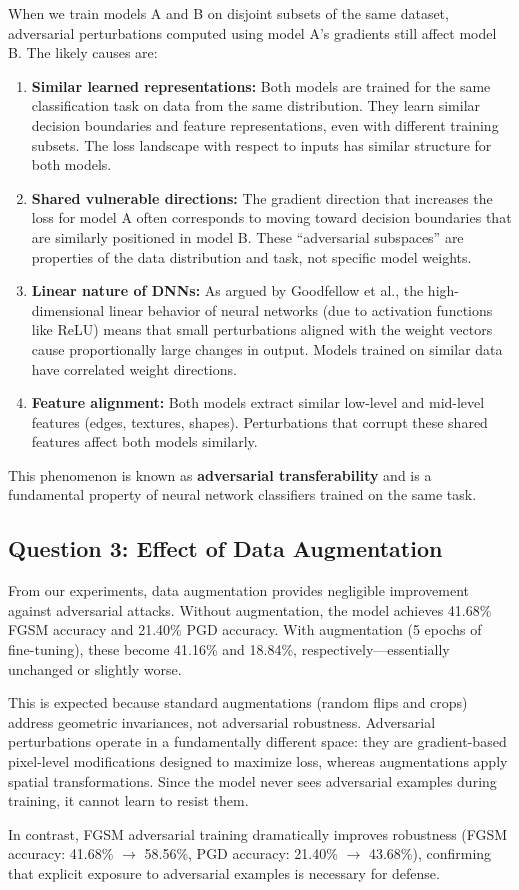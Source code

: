 \documentclass[11pt]{article}
\begin{document}
When we train models A and B on disjoint subsets of the same dataset, adversarial perturbations computed using model A's gradients still affect model B. The likely causes are:

\begin{enumerate}
    \item \textbf{Similar learned representations:} Both models are trained for the same classification task on data from the same distribution. They learn similar decision boundaries and feature representations, even with different training subsets. The loss landscape with respect to inputs has similar structure for both models.
    
    \item \textbf{Shared vulnerable directions:} The gradient direction that increases the loss for model A often corresponds to moving toward decision boundaries that are similarly positioned in model B. These ``adversarial subspaces'' are properties of the data distribution and task, not specific model weights.
    
    \item \textbf{Linear nature of DNNs:} As argued by Goodfellow et al., the high-dimensional linear behavior of neural networks (due to activation functions like ReLU) means that small perturbations aligned with the weight vectors cause proportionally large changes in output. Models trained on similar data have correlated weight directions.
    
    \item \textbf{Feature alignment:} Both models extract similar low-level and mid-level features (edges, textures, shapes). Perturbations that corrupt these shared features affect both models similarly.
\end{enumerate}

This phenomenon is known as \textbf{adversarial transferability} and is a fundamental property of neural network classifiers trained on the same task.

\subsection{Question 3: Effect of Data Augmentation}

From our experiments, data augmentation provides negligible improvement against adversarial attacks. Without augmentation, the model achieves 41.68\% FGSM accuracy and 21.40\% PGD accuracy. With augmentation (5 epochs of fine-tuning), these become 41.16\% and 18.84\%, respectively---essentially unchanged or slightly worse.

This is expected because standard augmentations (random flips and crops) address geometric invariances, not adversarial robustness. Adversarial perturbations operate in a fundamentally different space: they are gradient-based pixel-level modifications designed to maximize loss, whereas augmentations apply spatial transformations. Since the model never sees adversarial examples during training, it cannot learn to resist them.

In contrast, FGSM adversarial training dramatically improves robustness (FGSM accuracy: 41.68\% $\to$ 58.56\%, PGD accuracy: 21.40\% $\to$ 43.68\%), confirming that explicit exposure to adversarial examples is necessary for defense.
\end{document}
